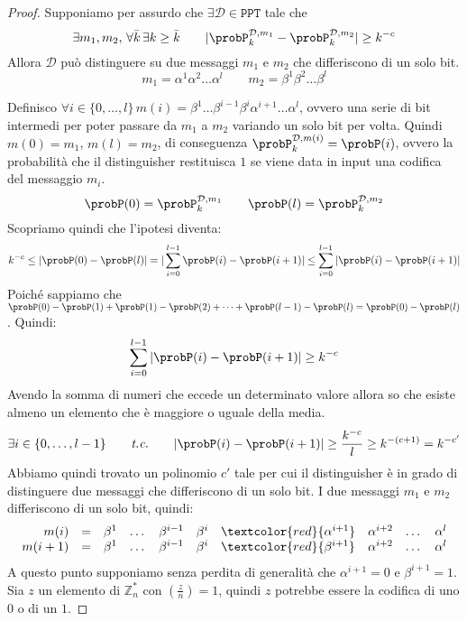 \begin{proof}
  Supponiamo per assurdo che $\exists \mathcal{D} \in \texttt{PPT}$ tale che 
  \[
    \exists m_1, m_2, \,\forall \bar{k} \, \exists k \geq \bar{k} \qquad
    |\probP_k^{\mathcal{D}, m_1} - \probP_k^{\mathcal{D}, m_2}| \geq k^{-c}
  \]
   Allora $\mathcal{D}$ può distinguere su due messaggi $m_1$ e $m_2$ che differiscono di un solo bit.
   \begin{equation*}
    m_1 = \alpha^1 \alpha^2 \dots \alpha^l \qquad
    m_2 = \beta^1 \beta^2 \dots \beta^l 
   \end{equation*}

Definisco $\forall i \in \{0,\dots,l\} \,m(i) = \beta^1 \dots \beta^{i-1} \beta^i \alpha^{i+1} \dots \alpha^l$, 
ovvero una serie di bit intermedi per poter passare da $m_1$ a $m_2$ variando un solo bit per volta.
Quindi $m(0) = m_1$, $m(l) = m_2$, di conseguenza $\probP_k^{\mathcal{D}, m(i)} = \probP(i)$, ovvero la probabilità 
che il distinguisher restituisca $1$ se viene data in input una codifica del messaggio $m_i$.
  \[
    \probP(0) = \probP_k^{\mathcal{D}, m_1} \qquad \probP(l) = \probP_k^{\mathcal{D}, m_2}
  \]
Scopriamo quindi che l'ipotesi diventa:
\[
  k^{-c} \leq |\probP(0) - \probP(l)| = |\sum_{i=0}^{l - 1} \probP(i) - \probP(i+1)| 
  \leq \sum_{i=0}^{l - 1} |\probP(i) - \probP(i+1)|
\]
Poiché sappiamo che $\probP(0) - \probP(1) + \probP(1) - \probP(2) + \dots + \probP(l-1) - \probP(l) = \probP(0) - \probP(l)$. 
Quindi:
\[
  \sum_{i=0}^{l - 1} |\probP(i) - \probP(i+1)| \geq k^{-c}
\]
Avendo la somma di numeri che eccede un determinato valore allora so che esiste almeno un elemento che è maggiore o uguale 
della media.
\[
  \exists i \in \{0,\dots,l-1\}\qquad \textit{t.c.} \qquad |\probP(i) - \probP(i+1)| \geq \frac{k^{-c}}{l} \geq k^{-(c+1)} = k^{-c'}
\]
Abbiamo quindi trovato un polinomio $c'$ tale per cui il distinguisher è in grado di distinguere due messaggi che differiscono
di un solo bit.
I due messaggi $m_1$ e $m_2$ differiscono di un solo bit, quindi:
\begin{align*}
  \begin{array}{r c lllllllll}
  m(i) & = & \beta^1 &\dots &\beta^{i-1} & \beta^i &\textcolor{red}{\alpha^{i+1}} & \alpha^{i+2} &\dots &\alpha^l \\
  m(i+1) & = & \beta^1 &\dots &\beta^{i-1} & \beta^i &\textcolor{red}{\beta^{i+1}} & \alpha^{i+2} &\dots &\alpha^l \\
  \end{array}
\end{align*}
A questo punto supponiamo senza perdita di generalità che $\alpha^{i+1} = 0$ e $\beta^{i+1} = 1$. Sia $z$ un 
elemento di $\mathbb{Z}_n^*$ con $\left( \frac{z}{n} \right) = 1$, quindi $z$ potrebbe essere la codifica di uno 
$0$ o di un $1$.


\end{proof}
